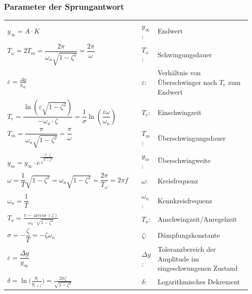 	\subsubsection{Parameter der Sprungantwort}
    \renewcommand{\arraystretch}{1.8}
    \begin{tabular}{|m{7cm}|m{1cm}m{0.5cm}m{8cm}}
      \cline{1-1}
      $y_{\infty} =A \cdot K$ & &
      $y_{\infty}$: & Endwert\\
      \cline{1-1}  
        $T_\omega = 2T_m=\dfrac{2\pi}{\omega_n \sqrt{1-\zeta^2}}=\dfrac{2\pi}{\omega}$ & &
        $T_{\omega}$: & Schwingungsdauer \\
      \cline{1-1}
      	$\varepsilon = \frac{\Delta y}{y_{\infty}}$ & &
      	$\varepsilon$: & Verhältnis von Überschwinger nach $T_e$ zum Endwert\\
      \cline{1-1}  
        $T_e = \dfrac{\ln\left(\varepsilon\sqrt{1-\zeta^2}\right)}{-\omega_n\cdot\zeta} = 
        \dfrac{1}{\sigma}\ln\left(\dfrac{\varepsilon\omega}{\omega_n}\right)$ & &
        $T_e$: & Einschwingzeit \\
      \cline{1-1}  
        $T_m = \dfrac{\pi}{\omega_n\sqrt{1-\zeta^2}}=\dfrac{\pi}{\omega}$ & &
        $T_m$: & Überschwingungsdauer\\
      \cline{1-1}  
      	$y_m = y_{\infty} \cdot e^{\frac{-\pi\cdot\zeta}{\sqrt{1-\zeta^2}}}$ & &
        $y_m$: & Überschwingweite\\
       \cline{1-1}  
        $\omega = \dfrac{1}{T}\sqrt{1-\zeta^2}= \omega_n\sqrt{1-\zeta^2}=\dfrac{2\pi}{T_\omega}=2\pi f$ & &
        $\omega$: & Kreisfrequenz \\
      \cline{1-1}  
        $\omega_n = \dfrac{1}{T}$ & &
        $\omega_n$: & Kennkreisfrequenz \\
      \cline{1-1}  
        $T_a = \frac{\pi - \arccos{(\zeta)}}{\omega_n\cdot\sqrt{1-\zeta^2}}$ & &
        $T_a$: & Anschwingzeit/Anregelzeit \\
      \cline{1-1}  
        $\sigma = -\dfrac{\zeta}{T} = -\zeta\omega_n$ & &
        $\zeta$: & Dämpfungskonstante \\
      \cline{1-1}  
        $\varepsilon =  \dfrac{\Delta y}{y_{\infty}}$ & &
        $\Delta y$: & Toleranzbereich der Amplitude im eingeschwungenen Zustand \\
      \cline{1-1}
      	$\delta = \ln{\Big(\frac{y_i}{y_{i+1}}\Big)} = \frac{2\pi \zeta}{\sqrt{1-\zeta^2}}$ & &
        $\delta$: & Logarithmisches Dekrement\\
      \cline{1-1}  
    \end{tabular}
    \renewcommand{\arraystretch}{1}
	
